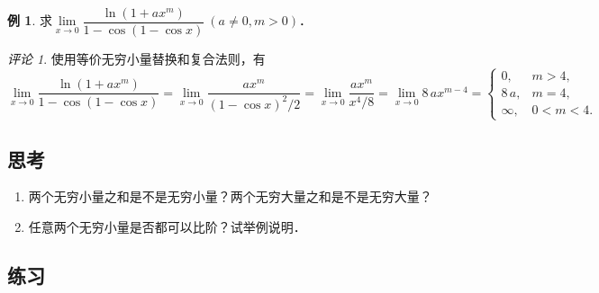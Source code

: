 \documentclass[a4paper,punct=CCT]{ctexbook}
\theoremstyle{definition}
\newtheorem*{example*}{例}
\theoremstyle{remark}
\newtheorem*{remark}{评论}
\newif\ifshowex
\newif\ifshowsolp
\begin{document}
\begin{example*}
  求\(\lim\limits_{x\to0} \dfrac{\ln(1+ax^m)}{1-\cos(1-\cos x)}\ (a \ne 0, m > 0)\)．\rule[-2ex]{0ex}{3.5ex}

  \begin{remark}
    使用等价无穷小量替换和复合法则，有
    \begin{equation*}
      \lim_{x\to0} \frac{\ln(1+ax^m)}{1-\cos(1-\cos x)}
      = \lim_{x\to0} \frac{ax^m}{(1-\cos x)^2\!/2}
      = \lim_{x\to0} \frac{ax^m}{x^4\!/8}
      = \lim_{x\to0} 8\,ax^{m-4} =
      \begin{cases}
        0, & m > 4, \\
        8\,a, & m = 4, \\
        \infty, & 0 < m < 4.
      \end{cases}
    \end{equation*}
  \end{remark}
\end{example*}

\subsection*{思考}

\begin{enumerate}
\item 两个无穷小量之和是不是无穷小量？两个无穷大量之和是不是无穷大量？

  \ifshowsolp
  是．不是．前者可由极限的加法法则得出．后者可以构造反例，函数\(f(x) = x,\ g(x) = -x\)．这里的\(\,f\mkern1mu\)和\(\mkern1mu g\)在无穷处都是无穷大量，但是\(f+g\)是常函数．
  \fi

\item 任意两个无穷小量是否都可以比阶？试举例说明．

  \ifshowsolp
  不一定．例如，函数\(x \sin\frac1x\)和\(x\)在原点处都是无穷小量，但是它们的商发散．
  \fi
\end{enumerate}

\ifshowex
{}
\subsection*{练习}
\end{document}
